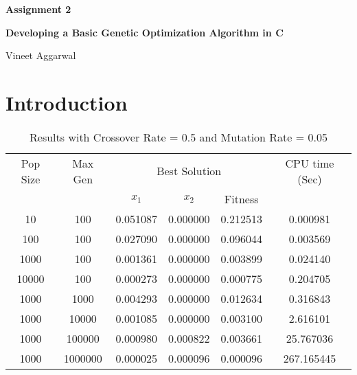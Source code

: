 \documentclass[12pt]{article}
\begin{document}
	\justifying

	\begin{center}
		\textbf{{\large Assignment 2}}

		\textbf{Developing a Basic Genetic Optimization Algorithm in C}

		Vineet Aggarwal
	\end{center}





	\section{Introduction}

	\begin{table}[h!]
		\caption{Results with Crossover Rate = 0.5 and Mutation Rate = 0.05}
		\label{table:1}
		\centering
		\begin{tabular}{c c c c c c}
			\hline
			Pop Size & Max Gen & \multicolumn{3}{c}{Best Solution} & CPU time (Sec) \\
			& & $x_1$ & $x_2$ & Fitness & \\
			\hline
			10  & 100    & 0.051087   &0.000000  &0.212513 &0.000981\\
			100 & 100    &0.027090  &0.000000 &0.096044 &0.003569\\
			1000& 100    &0.001361  &0.000000  &0.003899 &0.024140\\
			10000& 100    &0.000273  &0.000000   &0.000775 &0.204705\\
			\hline
			1000  & 1000   &0.004293  &0.000000 &0.012634 &0.316843\\
			1000 & 10000  &0.001085  &0.000000  &0.003100 &2.616101\\
			1000& 100000 &0.000980  &0.000822   &0.003661 &25.767036\\
			1000& 1000000 &0.000025  &0.000096   &0.000096 &267.165445\\
			\hline
		\end{tabular}
	\end{table}
\end{document}
